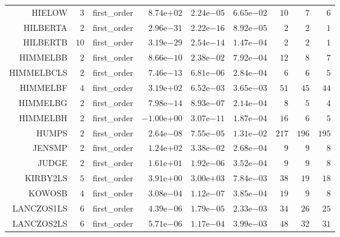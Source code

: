 \begin{longtable}{rrrrrrrrr}
HIELOW & \(     3\) & first\_order & \( 8.74\)e\(+02\) & \( 2.24\)e\(-05\) & \( 6.65\)e\(-02\) & \(    10\) & \(     7\) & \(     6\) \\
HILBERTA & \(     2\) & first\_order & \( 2.96\)e\(-31\) & \( 2.22\)e\(-16\) & \( 8.92\)e\(-05\) & \(     2\) & \(     2\) & \(     1\) \\
HILBERTB & \(    10\) & first\_order & \( 3.19\)e\(-29\) & \( 2.54\)e\(-14\) & \( 1.47\)e\(-04\) & \(     2\) & \(     2\) & \(     1\) \\
HIMMELBB & \(     2\) & first\_order & \( 8.66\)e\(-10\) & \( 2.38\)e\(-02\) & \( 7.92\)e\(-04\) & \(    12\) & \(     8\) & \(     7\) \\
HIMMELBCLS & \(     2\) & first\_order & \( 7.46\)e\(-13\) & \( 6.81\)e\(-06\) & \( 2.84\)e\(-04\) & \(     6\) & \(     6\) & \(     5\) \\
HIMMELBF & \(     4\) & first\_order & \( 3.19\)e\(+02\) & \( 6.52\)e\(-03\) & \( 3.65\)e\(-03\) & \(    51\) & \(    45\) & \(    44\) \\
HIMMELBG & \(     2\) & first\_order & \( 7.98\)e\(-14\) & \( 8.93\)e\(-07\) & \( 2.14\)e\(-04\) & \(     8\) & \(     5\) & \(     4\) \\
HIMMELBH & \(     2\) & first\_order & \(-1.00\)e\(+00\) & \( 3.07\)e\(-11\) & \( 1.87\)e\(-04\) & \(    16\) & \(     6\) & \(     5\) \\
HUMPS & \(     2\) & first\_order & \( 2.64\)e\(-08\) & \( 7.55\)e\(-05\) & \( 1.31\)e\(-02\) & \(   217\) & \(   196\) & \(   195\) \\
JENSMP & \(     2\) & first\_order & \( 1.24\)e\(+02\) & \( 3.38\)e\(-02\) & \( 2.68\)e\(-04\) & \(     9\) & \(     9\) & \(     8\) \\
JUDGE & \(     2\) & first\_order & \( 1.61\)e\(+01\) & \( 1.92\)e\(-06\) & \( 3.52\)e\(-04\) & \(     9\) & \(     9\) & \(     8\) \\
KIRBY2LS & \(     5\) & first\_order & \( 3.91\)e\(+00\) & \( 3.00\)e\(+03\) & \( 7.84\)e\(-03\) & \(    38\) & \(    19\) & \(    18\) \\
KOWOSB & \(     4\) & first\_order & \( 3.08\)e\(-04\) & \( 1.12\)e\(-07\) & \( 3.85\)e\(-04\) & \(    19\) & \(     9\) & \(     8\) \\
LANCZOS1LS & \(     6\) & first\_order & \( 4.39\)e\(-06\) & \( 1.79\)e\(-05\) & \( 2.33\)e\(-03\) & \(    34\) & \(    26\) & \(    25\) \\
LANCZOS2LS & \(     6\) & first\_order & \( 5.71\)e\(-06\) & \( 1.17\)e\(-04\) & \( 3.99\)e\(-03\) & \(    48\) & \(    32\) & \(    31\) \\

\end{longtable}
